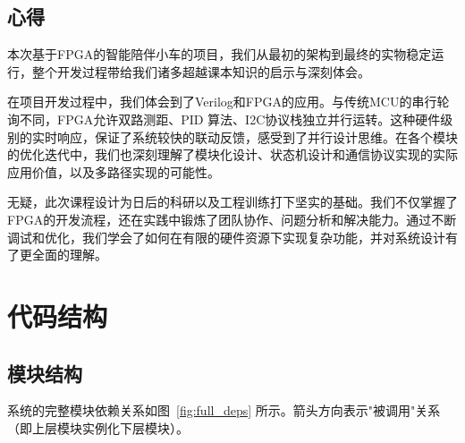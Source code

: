 \documentclass[12pt,a4paper]{ctexart}
\begin{document}
\subsection{心得}
本次基于FPGA的智能陪伴小车的项目，我们从最初的架构到最终的实物稳定运行，整个开发过程带给我们诸多超越课本知识的启示与深刻体会。

在项目开发过程中，我们体会到了Verilog和FPGA的应用。与传统MCU的串行轮询不同，FPGA允许双路测距、PID 算法、I2C协议栈独立并行运转。这种硬件级别的实时响应，保证了系统较快的联动反馈，感受到了并行设计思维。在各个模块的优化迭代中，我们也深刻理解了模块化设计、状态机设计和通信协议实现的实际应用价值，以及多路径实现的可能性。

无疑，此次课程设计为日后的科研以及工程训练打下坚实的基础。我们不仅掌握了FPGA的开发流程，还在实践中锻炼了团队协作、问题分析和解决能力。通过不断调试和优化，我们学会了如何在有限的硬件资源下实现复杂功能，并对系统设计有了更全面的理解。
\appendix

\section{代码结构}
\subsection{模块结构}

系统的完整模块依赖关系如图~\ref{fig:full_deps} 所示。箭头方向表示"被调用"关系（即上层模块实例化下层模块）。
\end{document}
